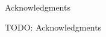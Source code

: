 \thispagestyle{empty}

\vspace*{20mm}

\begin{center}
    { Acknowledgments}
\end{center}

\vspace{10mm}

TODO: Acknowledgments

\cleardoublepage{}
